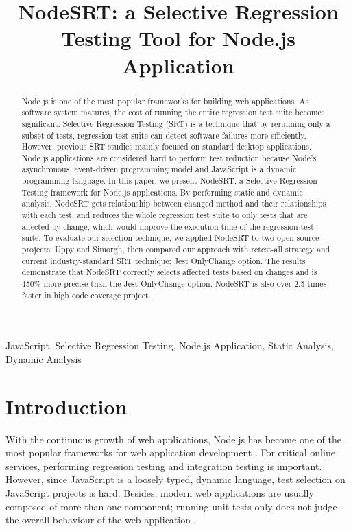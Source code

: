 \documentclass[10pt, conference]{IEEEtran}
\begin{document}
\title{NodeSRT: a Selective Regression Testing Tool for Node.js Application}

\author{
}

\maketitle

\begin{abstract}
Node.js is one of the most popular frameworks for building web applications. As software system 
matures, the cost of running the entire regression test suite becomes significant. 
Selective Regression Testing (SRT) is a technique that by rerunning only a subset of tests, regression test suite can detect software failures more efficiently. 
However, previous SRT studies mainly focused on standard desktop applications. Node.js applications are 
considered hard to perform test reduction because Node's asynchronous, event-driven programming model and 
JavaScript is a dynamic programming language. 
In this paper, we present NodeSRT, a Selective Regression Testing framework for Node.js applications. 
By performing static and dynamic analysis, NodeSRT gets relationship between changed method and their 
relationships with each test, and reduces the whole regression test suite to only tests that are 
affected by change, which would improve the execution time of the regression test suite. 
To evaluate our selection technique, we applied NodeSRT to two open-source projects: Uppy and Simorgh, 
then compared our approach with retest-all strategy and current industry-standard SRT technique: Jest 
OnlyChange option. The results demonstrate that NodeSRT correctly selects affected tests based on 
changes and is 450\% more precise than the Jest OnlyChange option. NodeSRT is also over 2.5 times faster in 
high code coverage project.
    
\end{abstract}

\begin{IEEEkeywords}
JavaScript, Selective Regression Testing, Node.js Application, Static Analysis, Dynamic Analysis
\end{IEEEkeywords}

\section{Introduction}
With the continuous growth of web applications, Node.js has become one of the most popular frameworks 
for web application development \cite{b16}. For critical online services, performing regression testing and integration testing is important. However, 
since JavaScript is a loosely typed, dynamic language, test 
selection on JavaScript projects is hard. Besides, modern web applications are usually composed of 
more than one component; running unit tests only does not judge the overall behaviour of the web 
application \cite{b8}. 
\end{document}
